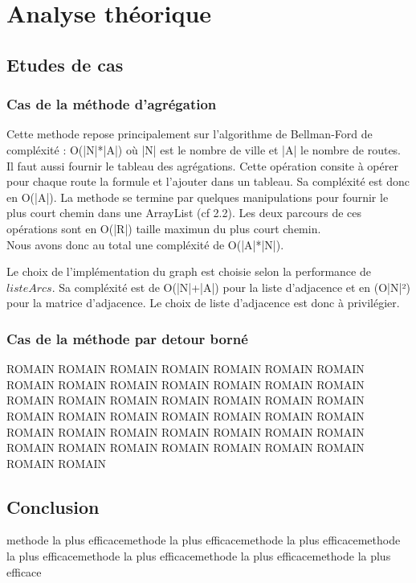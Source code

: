 \chapter{Analyse théorique}

\section{Etudes de cas}
\subsection{Cas de la méthode d'agrégation}

Cette methode repose principalement sur l'algorithme de Bellman-Ford de compléxité : O(|N|*|A|) où |N| est le nombre de ville et |A| le nombre de routes.
Il faut aussi fournir le tableau des agrégations. Cette opération consite à opérer pour chaque route la formule et l'ajouter dans un tableau. Sa compléxité est donc en O(|A|).
La methode se termine par quelques manipulations pour fournir le plus court chemin dans une ArrayList (cf 2.2). Les deux parcours de ces opérations sont en O(|R|) taille maximun du plus court chemin.
\\
Nous avons donc au total une compléxité de O(|A|*|N|).

Le choix de l'implémentation du graph est choisie selon la performance de $listeArcs$. Sa compléxité est de O(|N|+|A|) pour la liste d'adjacence et en (O|N|²) pour la matrice d'adjacence. Le choix de liste d'adjacence est donc à privilégier.

\subsection{Cas de la méthode par detour borné}
 ROMAIN ROMAIN ROMAIN ROMAIN ROMAIN ROMAIN ROMAIN ROMAIN ROMAIN ROMAIN ROMAIN ROMAIN ROMAIN ROMAIN ROMAIN ROMAIN ROMAIN ROMAIN ROMAIN ROMAIN ROMAIN ROMAIN ROMAIN ROMAIN ROMAIN ROMAIN ROMAIN ROMAIN ROMAIN ROMAIN ROMAIN ROMAIN ROMAIN ROMAIN ROMAIN ROMAIN ROMAIN ROMAIN ROMAIN ROMAIN ROMAIN ROMAIN ROMAIN ROMAIN

\section{Conclusion}%
methode la plus efficacemethode la plus efficacemethode la plus efficacemethode la plus efficacemethode la plus efficacemethode la plus efficacemethode la plus efficace


\clearpage


